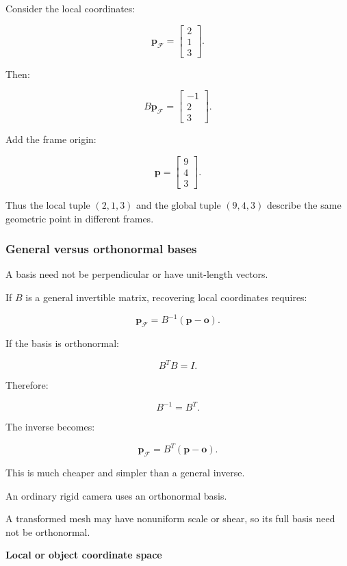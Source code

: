 Consider the local coordinates:

\[
 \mathbf p_{\mathcal F}= \begin{bmatrix}2\\1\\3\end{bmatrix}.
\]

Then:

\[
 B\mathbf p_{\mathcal F} = \begin{bmatrix}-1\\2\\3\end{bmatrix}.
\]

Add the frame origin:

\[
 \boxed{ \mathbf p= \begin{bmatrix}9\\4\\3\end{bmatrix} }.
\]

Thus the local tuple \((2,1,3)\) and the global tuple \((9,4,3)\) describe the same geometric point in different frames.

\subsubsection{General versus orthonormal bases}\label{02-foundations-ii-ch032-general-versus-orthonormal-bases}

A basis need not be perpendicular or have unit-length vectors.

If \(B\) is a general invertible matrix, recovering local coordinates requires:

\[
 \boxed{ \mathbf p_{\mathcal F} = B^{-1}(\mathbf p-\mathbf o) }.
\]

If the basis is orthonormal:

\[
 B^TB=I.
\]

Therefore:

\[
 B^{-1}=B^T.
\]

The inverse becomes:

\[
 \boxed{ \mathbf p_{\mathcal F} = B^T(\mathbf p-\mathbf o) }.
\]

This is much cheaper and simpler than a general inverse.

An ordinary rigid camera uses an orthonormal basis.

A transformed mesh may have nonuniform scale or shear, so its full basis need not be orthonormal.

\textbf{Local or object coordinate space}

